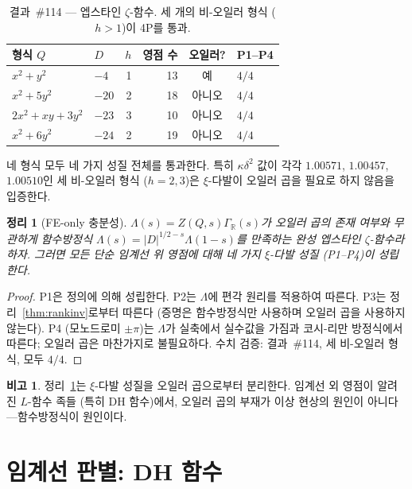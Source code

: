 \documentclass[11pt, a4paper]{article}
\theoremstyle{plain}
\newtheorem{theorem}{정리}
\theoremstyle{definition}
\newtheorem{remark}{비고}[section]
\begin{document}
\begin{table}[ht]
\centering
\caption{결과~\#114 — 엡스타인 $\zeta$-함수.
  세 개의 비-오일러 형식 ($h>1$)이 4P를 통과.}
\label{tab:ep114}
\small
\begin{tabular}{llrrcl}
\toprule
형식 $Q$ & $D$ & $h$ & 영점 수 & 오일러? & P1--P4 \\
\midrule
$x^{2}+y^{2}$           & $-4$  & 1 & 13 & 예  & $4/4$ \\
$x^{2}+5y^{2}$          & $-20$ & 2 & 18 & 아니오  & $4/4$ \\
$2x^{2}+xy+3y^{2}$      & $-23$ & 3 & 10 & 아니오  & $4/4$ \\
$x^{2}+6y^{2}$          & $-24$ & 2 & 19 & 아니오  & $4/4$ \\
\bottomrule
\end{tabular}
\end{table}

네 형식 모두 네 가지 성질 전체를 통과한다.
특히 $\kappa\delta^{2}$ 값이 각각 $1.00571$, $1.00457$, $1.00510$인
세 비-오일러 형식 ($h=2,3$)은 $\xi$-다발이
오일러 곱을 필요로 하지 않음을 입증한다.

\begin{theorem}[FE-only 충분성]
\label{thm:feonly}
  $\Lambda(s)=Z(Q,s)\Gamma_{\mathbb{R}}(s)$가
  오일러 곱의 존재 여부와 무관하게
  함수방정식 $\Lambda(s)=|D|^{1/2-s}\Lambda(1-s)$를 만족하는
  완성 엡스타인 $\zeta$-함수라 하자.
  그러면 모든 단순 임계선 위 영점에 대해
  네 가지 $\xi$-다발 성질 (P1--P4)이 성립한다.
\end{theorem}

\begin{proof}
  P1은 정의에 의해 성립한다. P2는 $\Lambda$에 편각 원리를 적용하여 따른다.
  P3는 정리~\ref{thm:rankinv}로부터 따른다
  (증명은 함수방정식만 사용하며 오일러 곱을 사용하지 않는다).
  P4 (모노드로미 $\pm\pi$)는 $\Lambda$가 실축에서 실수값을 가짐과
  코시-리만 방정식에서 따른다; 오일러 곱은 마찬가지로 불필요하다.
  수치 검증: 결과~\#114, 세 비-오일러 형식, 모두 $4/4$.
\end{proof}

\begin{remark}
  정리~\ref{thm:feonly}는 $\xi$-다발 성질을 오일러 곱으로부터
  분리한다. 임계선 외 영점이 알려진 $L$-함수 족들
  (특히 DH 함수)에서, 오일러 곱의 부재가
  이상 현상의 원인이 아니다---함수방정식이 원인이다.
\end{remark}


\section{임계선 판별: DH 함수}
\label{sec:dh}
\end{document}
